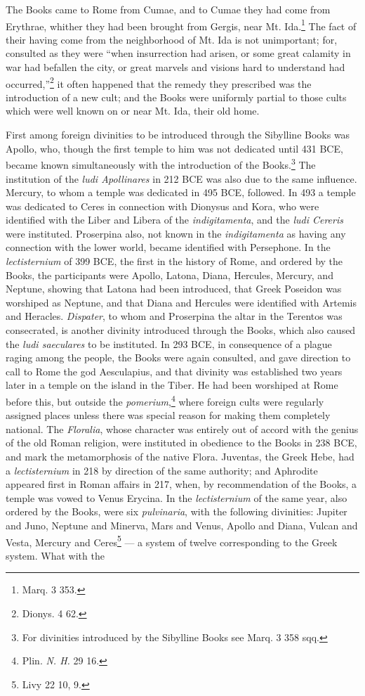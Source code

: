 \documentclass[a4paper, 11pt, oneside, polutonikogreek, french]{article}
\begin{document}
The Books came to Rome from Cumae, and to Cumae they had come from Erythrae, whither they had been brought from Gergis, near Mt. Ida.\footnote{Marq. 3 353.} The fact of their having come from the neighborhood of Mt. Ida is not unimportant; for, consulted as they were ``when insurrection had arisen, or some great calamity in war had befallen the city, or great marvels and visions hard to understand had occurred,''\footnote{Dionys. 4 62.} it often happened that the remedy they prescribed was the introduction of a new cult; and the Books were uniformly partial to those cults which were well known on or near Mt. Ida, their old home.

First among foreign divinities to be introduced through the Sibylline Books was Apollo, who, though the first temple to him was not dedicated until 431 \textsc{BCE}, became known simultaneously with the introduction of the Books.\footnote{For divinities introduced by the Sibylline Books see Marq. 3 358 sqq.} The institution of the \emph{ludi Apollinares} in 212 \textsc{BCE} was also due to the same influence. Mercury, to whom a temple was dedicated in 495 \textsc{BCE}, followed. In 493 a temple was dedicated to Ceres in connection with Dionysus and Kora, who were identified with the Liber and Libera of the \emph{indigitamenta}, and the \emph{ludi Cereris} were instituted. Proserpina also, not known in the \emph{indigitamenta} as having any connection with the lower world, became identified with Persephone. In the \emph{lectisternium} of 399 \textsc{BCE}, the first in the history of Rome, and ordered by the Books, the participants were Apollo, Latona, Diana, Hercules, Mercury, and Neptune, showing that Latona had been introduced, that Greek Poseidon was worshiped as Neptune, and that Diana and Hercules were identified with Artemis and Heracles. \emph{Dispater}, to whom and Proserpina the altar in the Terentos was consecrated, is another divinity introduced through the Books, which also caused the \emph{ludi saeculares} to be instituted. In 293 \textsc{BCE}, in consequence of a plague raging among the people, the Books were again consulted, and gave direction to call to Rome the god Aesculapius, and that divinity was established two years later in a temple on the island in the Tiber. He had been worshiped at Rome before this, but outside the \emph{pomerium},\footnote{Plin. \emph{N. H.} 29 16.} where foreign cults were regularly assigned places unless there was special reason for making them completely national. The \emph{Floralia}, whose character was entirely out of accord with the genius of the old Roman religion, were instituted in obedience to the Books in 238 \textsc{BCE}, and mark the metamorphosis of the native Flora. Juventas, the Greek Hebe, had a \emph{lectisternium} in 218 by direction of the same authority; and Aphrodite appeared first in Roman affairs in 217, when, by recommendation of the Books, a temple was vowed to Venus Erycina. In the \emph{lectisternium} of the same year, also ordered by the Books, were six \emph{pulvinaria}, with the following divinities: Jupiter and Juno, Neptune and Minerva, Mars and Venus, Apollo and Diana, Vulcan and Vesta, Mercury and Ceres\footnote{Livy 22 10, 9.} --- a system of twelve corresponding to the Greek system. What with the 
\end{document}
